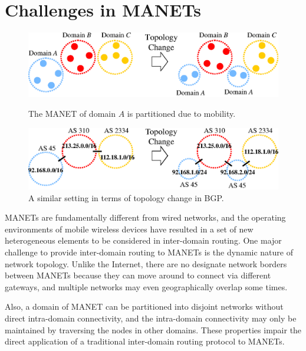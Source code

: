 \section{Challenges in MANETs}
\label{sec::challenges}

\begin{figure}[htb!] 
  \hfill
  \begin{minipage}[t]{.47\textwidth}
    \begin{center}  
      \includegraphics[scale=0.55]{challenges1}
        \caption{The MANET of domain $A$ is partitioned due to mobility.} \label{fig:challenges1}
    \end{center}
  \end{minipage}
  \hfill \quad
  \begin{minipage}[t]{.47\textwidth}
    \begin{center}  
       \includegraphics[scale=0.55]{challenges2} 
        \caption{A similar setting in terms of topology change in BGP.} \label{fig:challenges2} 
    \end{center}
  \end{minipage}
  \hfill 
\end{figure}


MANETs are fundamentally different from wired networks, and the
operating environments of mobile wireless devices have resulted in a
set of new heterogeneous elements to be considered in inter-domain
routing.  One major challenge to provide inter-domain routing to
MANETs is the dynamic nature of network topology. Unlike the Internet,
there are no designate network borders between MANETs because they can
move around to connect via different gateways, and multiple networks
may even geographically overlap some times.

Also, a domain of MANET can be partitioned into disjoint networks
without direct intra-domain connectivity, and the intra-domain
connectivity may only be maintained by traversing the nodes in other
domains. These properties impair the direct application of a
traditional inter-domain routing protocol to MANETs. 


